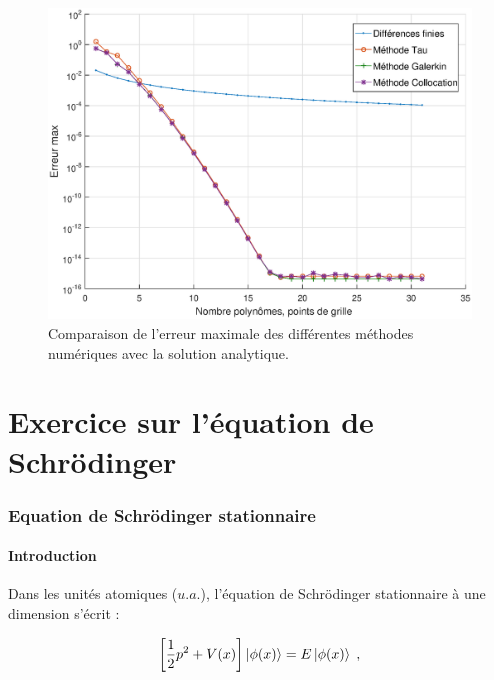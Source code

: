\documentclass{report}
\begin{document}
\begin{figure}[h]
  \includegraphics[width=16cm]{graphe_erreur.eps}
  \caption{Comparaison de l'erreur maximale des différentes méthodes numériques avec la solution analytique.}
  \label{fig_erreur}
\end{figure}


 \part{Exercice sur l'équation de Schrödinger}
\setcounter{section}{0}
\setcounter{equation}{0}
 


\section{Equation de Schrödinger stationnaire}

\subsection{Introduction}

Dans les unités atomiques ($u.a.$), l'équation de Schrödinger stationnaire à une dimension s'écrit :

\begin{equation}\label{eq:sta}
\left[\frac{1}{2}p^{2}+V(x)\right]\ket{\phi(x)}= E\ket{\phi(x)}\;,
\end{equation}
\end{document}
